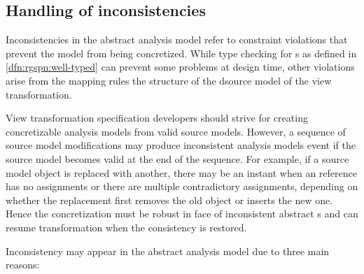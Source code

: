 \subsection{Handling of inconsistencies}
\label{ssec:transform:inconsistent}

Inconsistencies in the abstract  analysis model refer to constraint violations that prevent the model from being concretized. While type checking for s as defined in \vref{dfn:rgspn:well-typed} can prevent some problems at design time, other violations arise from the mapping rules the structure of the dsource model of the view transformation.

View transformation specification developers should strive for creating concretizable analysis models from valid source models. However, a sequence of source model modifications may produce inconsistent analysis models event if the source model becomes valid at the end of the sequence. For example, if a source model object is replaced with another, there may be an instant when an  reference has no assignments or there are multiple contradictory assignments, depending on whether the replacement first removes the old object or inserts the new one. Hence the concretization must be robust in face of inconsistent abstract s and can resume transformation when the consistency is restored.

Inconsistency may appear in the abstract analysis model due to three main reasons:

